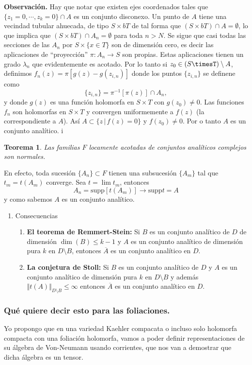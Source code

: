 \documentclass[letterpaper]{article}
\newtheorem{teorema}{Teorema}[section]
\newcommand{\obs}{{\newline \noindent \sc \textbf{Observación. }}}
\begin{document}
\obs Hay que notar que existen ejes coordenados tales que \(\{z_1=0,\cdots,z_k=0\}\cap A\) es un conjunto disconexo. Un punto de \(A\) tiene una vecindad tubular ahuecada, de tipo \(S\times bT\) de tal forma que \((S\times bT)\cap A=\emptyset\), lo que implica que \((S\times bT)\cap A_n=\emptyset\) para toda \(n>N\). Se sigue que casi todas las secciones de las \(A_n\) por \(S\times\{x\in T\}\) son de dimensión cero, es decir las aplicaciones de ``proyección'' \(\pi:A_n\rightarrow S\) son propias. Estas aplicaciones tienen un grado \(\lambda_n\) que evidentemente es acotado. Por lo tanto si \(z_0\in(S\timesT)\setminus A\), definimos \(f_n(z)=\pi[g(z)-g(z_{i,n})]\) donde los puntos \(\{z_{i,n}\}\) se definene como
\[
\{z_{i,n}\}=\pi^{-1}[\pi(z)]\cap A_n,
\]
y donde \(g(z)\) es una función holomorfa en \(S\times T\) con \(g(z_0)\neq0\). Las funciones \(f_n\) son holomorfas en \(S\times T\) y convergen uniformemente a \(f(z)\) (la correspondiente a \(A\)). Así \(A\subset\{z\,|\,f(z)=0\}\) y \(f(z_0)\neq0\). Por o tanto \(A\) es un conjunto analítico.
i\begin{teorema}
Las familias \(F\) locamente acotadas de conjuntos analíticos complejos son normales.
\end{teorema}
En efecto, toda sucesión \(\{A_n\}\subset F\) tienen una subsucesión \(\{A_m\}\) tal que \(t_m=t(A_m)\) converge. Sea \(t=\lim t_m\), entonces
\[
    A_n=\mathrm{supp}[t(A_m)]\rightarrow\mathrm{supp}t=A
\]
y como sabemos \(A\) es un conjunto analítico.
\begin{enumerate}
\item Consecuencias
\label{sec:org02bb745}
\begin{enumerate}
\item \textbf{El teorema de Remmert-Stein:} Si \(B\) es un conjunto analítico de \(D\) de dimensión \(\dim(B)\leq k-1\) y \(A\) es un conjunto analítico de dimensión pura \(k\) en \(D\setminus B\), entonces \(\overline{A}\) es un conjunto analítico en \(D\).
\item \textbf{La conjetura de Stoll:} Si \(B\) es un conjunto analítico de \(D\) y \(A\) es un conjunto analítico de dimensión pura \(k\) en \(D\setminus B\) y además \(\Vert t(A)\Vert_{D\setminus B}\leq\infty\) entonces \(\overline{A}\) es un conjunto analítico en \(D\).
\end{enumerate}
\end{enumerate}
\subsubsection{Qué quiere decir esto para las foliaciones.}
\label{sec:orgcfd4ce9}
\noindent Yo propongo que en una variedad Kaehler compacata o incluso solo holomorfa compacta con una foliación holomorfa, vamos a poder definir representaciones de su álgebra de Von-Neumann usando corrientes, que nos van a demostrar que dicha álgebra es un tensor.
\end{document}
